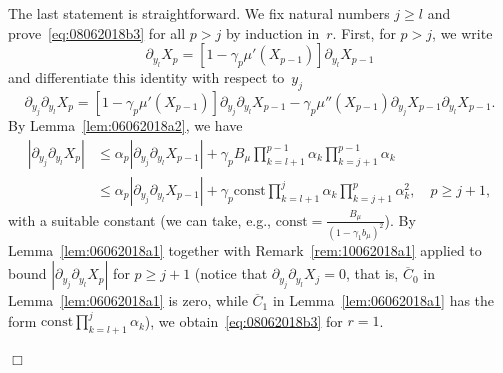 \documentclass[preprint]{imsart}
\newcommand{\proofendsign}{$\Box$}
\newenvironment{proof}{{\noindent \bf Proof }}
 {{\hspace*{\fill}\proofendsign\par\bigskip}}
\newcommand*{\const}{\mathrm{const}}
\newcommand*{\ol}{\overline}
\begin{document}
\begin{proof}
The last statement is straightforward.
We fix natural numbers $j\ge l$ and prove~\eqref{eq:08062018b3}
for all $p>j$ by induction in~$r$.
First, for $p>j$, we write
$$
\partial_{y_{l}}X_{p}
=\left[1-\gamma_{p}\mu'(X_{p-1})\right]\partial_{y_{l}}X_{p-1}
$$
and differentiate this identity with respect to~$y_j$
$$
\partial_{y_{j}}\partial_{y_{l}}X_{p}
=\left[1-\gamma_{p}\mu'(X_{p-1})\right]\partial_{y_{j}}\partial_{y_{l}}X_{p-1}-\gamma_{p}\mu''(X_{p-1})\partial_{y_{j}}X_{p-1}\partial_{y_{l}}X_{p-1}.
$$
By Lemma~\ref{lem:06062018a2}, we have
\begin{align*}
|\partial_{y_{j}}\partial_{y_{l}}X_{p}|
&\le\alpha_p|\partial_{y_{j}}\partial_{y_{l}}X_{p-1}|
+\gamma_{p}
B_\mu
\prod_{k=l+1}^{p-1}\alpha_k
\prod_{k=j+1}^{p-1}\alpha_k\\
&\le\alpha_p|\partial_{y_{j}}\partial_{y_{l}}X_{p-1}|
+\gamma_{p}
\const
\prod_{k=l+1}^{j}\alpha_k
\prod_{k=j+1}^{p}\alpha_k^2,
\quad p\ge j+1,
\end{align*}
with a suitable constant
(we can take, e.g., $\const=\frac{B_\mu}{(1-\gamma_1 b_\mu)^2}$).
By Lemma~\ref{lem:06062018a1}
together with Remark~\ref{rem:10062018a1} applied
to bound $|\partial_{y_{j}}\partial_{y_{l}}X_{p}|$
for $p\ge j+1$
(notice that $\partial_{y_j}\partial_{y_l}X_j=0$, that is,
$\ol C_0$ in Lemma~\ref{lem:06062018a1} is zero,
while $\ol C_1$ in Lemma~\ref{lem:06062018a1}
has the form $\const\prod_{k=l+1}^j \alpha_k$),
we obtain~\eqref{eq:08062018b3} for $r=1$.


\end{proof}
\end{document}
